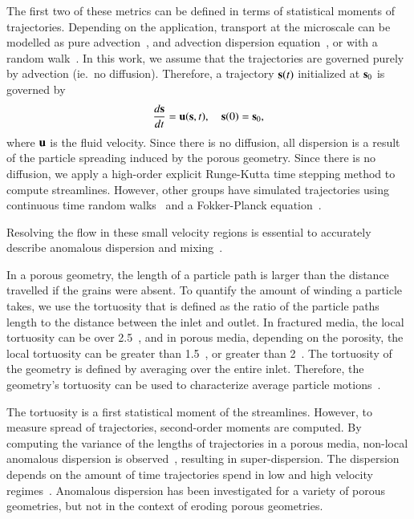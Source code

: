 \documentclass[preprint, 10pt]{elsarticle}
\begin{document}
The first two of these metrics can be defined in terms of statistical
moments of trajectories.  Depending on the application, transport at the
microscale can be modelled as pure advection~\cite{dea-qua-bir-jua2018,
leb-ded-dav-bou2007, cve-che-wen1996, puy-gou-den2019}, and advection
dispersion equation~\cite{cus-hu-den1995, dag1987, den-ica-hid2018}, or
with a random walk~\cite{saf1959, bij-blu2006, ber-sch-sil2000}.  In
this work, we assume that the trajectories are governed purely by
advection (ie.~no diffusion).  Therefore, a trajectory $\ss(t)$
initialized at $\ss_0$ is governed by
\begin{align}
  \frac{d\ss}{dt} = \uu(\ss,t), \quad \ss(0) = \ss_0,
  \label{eqn:tracers}
\end{align}
where $\uu$ is the fluid velocity.  Since there is no diffusion, all
dispersion is a result of the particle spreading induced by the porous
geometry.  Since there is no diffusion, we apply a high-order explicit
Runge-Kutta time stepping method to compute streamlines.  However, other
groups have simulated trajectories using continuous time random
walks~\cite{mon-wei1965, den-cor-sch-ber2004, leb-den-car2008,
ber-cor-den-sch2006} and a Fokker-Planck equation~\cite{ica-den2019}.

Resolving the flow in these small velocity regions is essential to
accurately describe anomalous dispersion and
mixing~\cite{leb-den-dav-bol-car-dec-bou2011, den-leb-eng-bij2011}.


In a porous geometry, the length of a particle path is larger than the
distance travelled if the grains were absent.  To quantify the amount of
winding a particle takes, we use the tortuosity that is defined as the
ratio of the particle paths length to the distance between the inlet and
outlet.  In fractured media, the local tortuosity can be over
2.5~\cite{hym-den-hag-kan2019}, and in porous media, depending on the
porosity, the local tortuosity can be greater than
1.5~\cite{kop-kat-tim1996, mat-kha-koz2008}, or greater than
2~\cite{dud-koz-mat2011}.  The tortuosity of the geometry is defined by
averaging over the entire inlet.  Therefore, the geometry's tortuosity
can be used to characterize average particle
motions~\cite{hak-com-den2019}.

The tortuosity is a first statistical moment of the streamlines.
However, to measure spread of trajectories, second-order moments are
computed. By computing the variance of the lengths of trajectories in a
porous media, non-local anomalous dispersion is
observed~\cite{kan-dea-nun-bij-blu-jua2014, cus-hu-den1995,
dea-leb-den-tar-bol-dav2013}, resulting in super-dispersion.  The
dispersion depends on the amount of time trajectories spend in low and
high velocity regimes~\cite{ber-sch2001}.  Anomalous dispersion has been
investigated for a variety of porous geometries, but not in the context
of eroding porous geometries.
\end{document}
